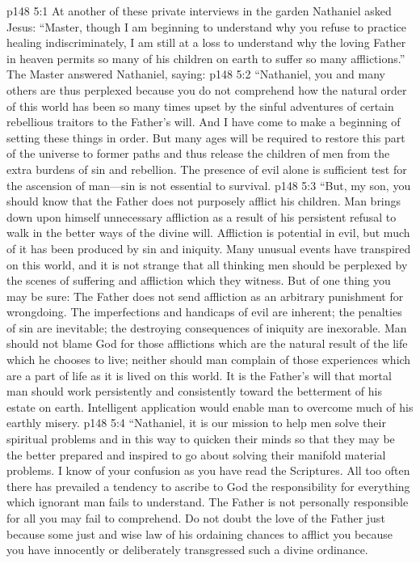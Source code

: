 \vs p148 5:1 At another of these private interviews in the garden Nathaniel asked Jesus: “Master, though I am beginning to understand why you refuse to practice healing indiscriminately, I am still at a loss to understand why the loving Father in heaven permits so many of his children on earth to suffer so many afflictions.” The Master answered Nathaniel, saying:
\pc \vs p148 5:2 \textcolor{ubdarkred}{“Nathaniel, you and many others are thus perplexed because you do not comprehend how the natural order of this world has been so many times upset by the sinful adventures of certain rebellious traitors to the Father’s will. And I have come to make a beginning of setting these things in order. But many ages will be required to restore this part of the universe to former paths and thus release the children of men from the extra burdens of sin and rebellion. The presence of evil alone is sufficient test for the ascension of man---sin is not essential to survival.}
\vs p148 5:3 \textcolor{ubdarkred}{“But, my son, you should know that the Father does not purposely afflict his children. Man brings down upon himself unnecessary affliction as a result of his persistent refusal to walk in the better ways of the divine will. Affliction is potential in evil, but much of it has been produced by sin and iniquity. Many unusual events have transpired on this world, and it is not strange that all thinking men should be perplexed by the scenes of suffering and affliction which they witness. But of one thing you may be sure: The Father does not send affliction as an arbitrary punishment for wrongdoing. The imperfections and handicaps of evil are inherent; the penalties of sin are inevitable; the destroying consequences of iniquity are inexorable. Man should not blame God for those afflictions which are the natural result of the life which he chooses to live; neither should man complain of those experiences which are a part of life as it is lived on this world. It is the Father’s will that mortal man should work persistently and consistently toward the betterment of his estate on earth. Intelligent application would enable man to overcome much of his earthly misery.}
\vs p148 5:4 \textcolor{ubdarkred}{“Nathaniel, it is our mission to help men solve their spiritual problems and in this way to quicken their minds so that they may be the better prepared and inspired to go about solving their manifold material problems. I know of your confusion as you have read the Scriptures. All too often there has prevailed a tendency to ascribe to God the responsibility for everything which ignorant man fails to understand. The Father is not personally responsible for all you may fail to comprehend. Do not doubt the love of the Father just because some just and wise law of his ordaining chances to afflict you because you have innocently or deliberately transgressed such a divine ordinance.}
